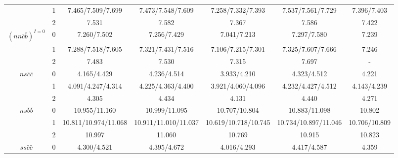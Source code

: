 \documentclass[prd,twocolumn,floatfix,nofootinbib]{revtex4}
\begin{document}
\begin{table}[!htbp]
\begin{tabular}{ccccccc}
                        &1      &7.465/7.509/7.699      &7.473/7.548/7.609                   &7.258/7.332/7.393                   &7.537/7.561/7.729      &7.396/7.403 \\ 
                        &2      &7.531                  &7.582                               &7.367                               &7.586                  &7.422 \\ 
        ${(nn\bar{c}\bar{b})}^{I=0}$ 
                        &0      &7.260/7.502            &7.256/7.429                         &7.041/7.213                         &7.297/7.580            &7.239 \\ 
                        &1      &7.288/7.518/7.605      &7.321/7.431/7.516                   &7.106/7.215/7.301                   &7.325/7.607/7.666      &7.246 \\ 
                        &2      &7.483                  &7.530                               &7.315                               &7.697                  &- \\ 
        $ns\bar{c}\bar{c}$ 
                        &0      &4.165/4.429            &4.236/4.514                         &3.933/4.210                         &4.323/4.512            &4.221 \\ 
                        &1      &4.091/4.247/4.314      &4.225/4.363/4.400                   &3.921/4.060/4.096                   &4.232/4.427/4.512      &4.143/4.239 \\ 
                        &2      &4.305                  &4.434                               &4.131                               &4.440                  &4.271 \\ 
        $ns\bar{b}\bar{b}$ 
                        &0      &10.955/11.160          &10.999/11.095                       &10.707/10.804                       &10.883/11.098          &10.802 \\ 
                        &1      &10.811/10.974/11.068   &10.911/11.010/11.037                &10.619/10.718/10.745                &10.734/10.897/11.046   &10.706/10.809 \\ 
                        &2      &10.997                 &11.060                              &10.769                              &10.915                 &10.823 \\ 
        $ss\bar{c}\bar{c}$   
                        &0      &4.300/4.521            &4.395/4.672                         &4.016/4.293                         &4.417/4.587            &4.359 \\ 

\end{tabular}
\end{table}
\end{document}
